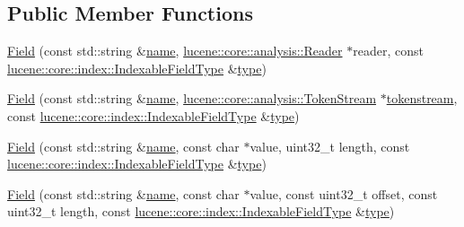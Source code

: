 \subsection*{Public Member Functions}
\begin{DoxyCompactItemize}
\item 
\mbox{\hyperlink{classlucene_1_1core_1_1document_1_1Field_a73c99d30182a64aa3508ccd8d282b3df}{Field}} (const std\+::string \&\mbox{\hyperlink{classlucene_1_1core_1_1document_1_1Field_a550ee69f8cb7db2a00f3e9bda4964dfb}{name}}, \mbox{\hyperlink{classlucene_1_1core_1_1analysis_1_1Reader}{lucene\+::core\+::analysis\+::\+Reader}} $\ast$reader, const \mbox{\hyperlink{classlucene_1_1core_1_1index_1_1IndexableFieldType}{lucene\+::core\+::index\+::\+Indexable\+Field\+Type}} \&\mbox{\hyperlink{classlucene_1_1core_1_1document_1_1Field_ad627895c156c58f9bd409caf06edbdf4}{type}})
\item 
\mbox{\hyperlink{classlucene_1_1core_1_1document_1_1Field_a1824a5b7f755f7489374bd8591a95ea9}{Field}} (const std\+::string \&\mbox{\hyperlink{classlucene_1_1core_1_1document_1_1Field_a550ee69f8cb7db2a00f3e9bda4964dfb}{name}}, \mbox{\hyperlink{classlucene_1_1core_1_1analysis_1_1TokenStream}{lucene\+::core\+::analysis\+::\+Token\+Stream}} $\ast$\mbox{\hyperlink{classlucene_1_1core_1_1document_1_1Field_a9ae72843cbdd8524362f65ee9f2c7355}{tokenstream}}, const \mbox{\hyperlink{classlucene_1_1core_1_1index_1_1IndexableFieldType}{lucene\+::core\+::index\+::\+Indexable\+Field\+Type}} \&\mbox{\hyperlink{classlucene_1_1core_1_1document_1_1Field_ad627895c156c58f9bd409caf06edbdf4}{type}})
\item 
\mbox{\hyperlink{classlucene_1_1core_1_1document_1_1Field_a0fccd05c5f81e3a7878a6a935fc871ca}{Field}} (const std\+::string \&\mbox{\hyperlink{classlucene_1_1core_1_1document_1_1Field_a550ee69f8cb7db2a00f3e9bda4964dfb}{name}}, const char $\ast$value, uint32\+\_\+t length, const \mbox{\hyperlink{classlucene_1_1core_1_1index_1_1IndexableFieldType}{lucene\+::core\+::index\+::\+Indexable\+Field\+Type}} \&\mbox{\hyperlink{classlucene_1_1core_1_1document_1_1Field_ad627895c156c58f9bd409caf06edbdf4}{type}})
\item 
\mbox{\hyperlink{classlucene_1_1core_1_1document_1_1Field_ae734a4c9a4393bca54098a9016bc6fda}{Field}} (const std\+::string \&\mbox{\hyperlink{classlucene_1_1core_1_1document_1_1Field_a550ee69f8cb7db2a00f3e9bda4964dfb}{name}}, const char $\ast$value, const uint32\+\_\+t offset, const uint32\+\_\+t length, const \mbox{\hyperlink{classlucene_1_1core_1_1index_1_1IndexableFieldType}{lucene\+::core\+::index\+::\+Indexable\+Field\+Type}} \&\mbox{\hyperlink{classlucene_1_1core_1_1document_1_1Field_ad627895c156c58f9bd409caf06edbdf4}{type}})

\end{DoxyCompactItemize}
